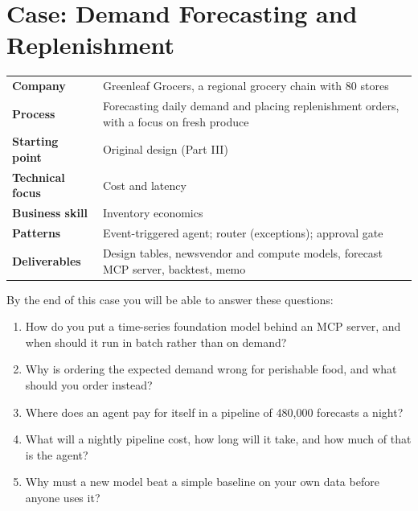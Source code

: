 
\chapter{Case: Demand Forecasting and Replenishment}
\label{ch:case-forecast}

\begin{caseglance}
\begin{tabularx}{\linewidth}{@{}>{\bfseries}p{3.4cm}X@{}}
Company & Greenleaf Grocers, a regional grocery chain with 80 stores \\
Process & Forecasting daily demand and placing replenishment orders, with a focus on fresh produce \\
Starting point & Original design (Part III) \\
Technical focus & Cost and latency \\
Business skill & Inventory economics \\
Patterns & Event-triggered agent; router (exceptions); approval gate \\
Deliverables & Design tables, newsvendor and compute models, forecast MCP server, backtest, memo
\end{tabularx}
\end{caseglance}

\begin{chapterquestions}
By the end of this case you will be able to answer these questions:
\begin{enumerate}[leftmargin=*,itemsep=2pt]
  \item How do you put a time-series foundation model behind an MCP server, and when should it run in batch rather than on demand?
  \item Why is ordering the expected demand wrong for perishable food, and what should you order instead?
  \item Where does an agent pay for itself in a pipeline of 480{,}000 forecasts a night?
  \item What will a nightly pipeline cost, how long will it take, and how much of that is the agent?
  \item Why must a new model beat a simple baseline on your own data before anyone uses it?
\end{enumerate}
\end{chapterquestions}

